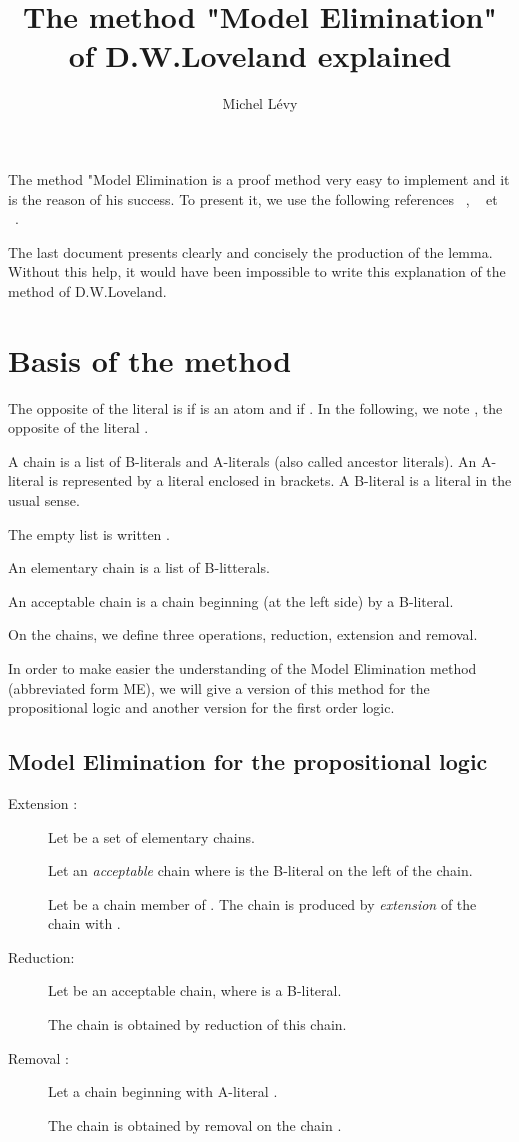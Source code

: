 \documentclass{article}
\title{The method "Model Elimination" of D.W.Loveland explained}
\author{Michel Lévy}
\begin{document}
\maketitle
\tableofcontents
The method "Model Elimination is a proof method very easy to implement and it is the reason of his success.
To present it, we use the following references
 ~\cite{Loveland1997}, ~\cite{Loveland1978} et  ~\cite{CSC648}.

The last document presents clearly and concisely the production of the lemma. Without this help, it would have been impossible
to write this explanation of the method of D.W.Loveland.




\section{Basis of the method}

The opposite of the literal  is  if  is an atom and  if .
In the following, we note  
 , the opposite of the literal .

A chain is a list of B-literals and A-literals (also called ancestor literals). An A-literal is represented by a literal
enclosed in brackets. A B-literal is a literal in the usual sense.

The empty list is written .

An elementary chain is a list of B-litterals.

An acceptable chain is a chain beginning (at the left side) by a B-literal.

On the chains, we define three operations, reduction, extension and removal.

In order to make easier the understanding of the Model Elimination method (abbreviated form ME), we will give a version of
this method for the propositional logic and another version for the first order logic.


\subsection{Model Elimination for the propositional logic}

\begin{description}
\item [Extension :]
Let  be a set of elementary chains. 

Let  an \emph{acceptable} chain where  is the B-literal on the left of the chain.

Let  be a chain member of .
The chain   is produced by \emph{extension} of the chain  with .


\item [Reduction:]
Let  be an acceptable chain, where  is a B-literal.

The chain  is obtained by reduction of this chain.


\item [Removal :]
Let  a chain beginning with A-literal .

The chain  is obtained by removal on the chain .


\end{description}
\end{document}
